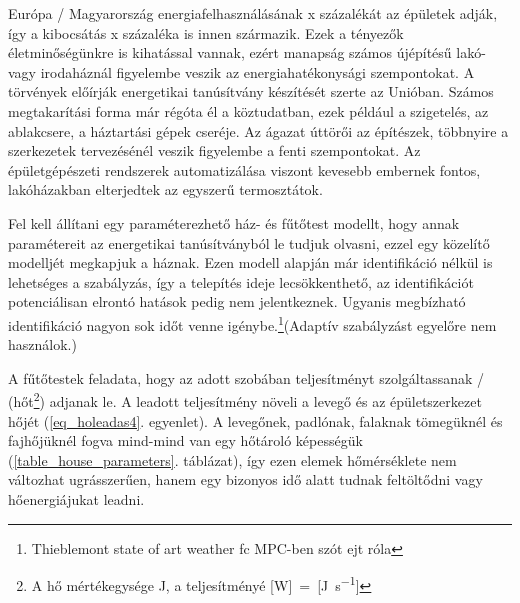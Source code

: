 Európa / Magyarország energiafelhasználásának x százalékát az épületek adják, így a kibocsátás x százaléka is innen származik.
Ezek a tényezők életminőségünkre is kihatással vannak, ezért manapság számos újépítésű lakó- vagy irodaháznál figyelembe veszik az energiahatékonysági szempontokat. A törvények előírják energetikai tanúsítvány készítését szerte az Unióban. Számos megtakarítási forma már régóta él a köztudatban, ezek például a szigetelés, az ablakcsere, a háztartási gépek cseréje. Az ágazat úttörői az építészek, többnyire a szerkezetek tervezésénél veszik figyelembe a fenti szempontokat.
Az épületgépészeti rendszerek automatizálása viszont kevesebb embernek fontos, lakóházakban elterjedtek az egyszerű termosztátok.




Fel kell állítani egy paraméterezhető ház- és fűtőtest modellt, hogy annak paramétereit az energetikai tanúsítványból le tudjuk olvasni, ezzel egy közelítő modelljét megkapjuk a háznak. Ezen modell alapján már identifikáció nélkül is lehetséges a szabályzás, így a telepítés ideje lecsökkenthető, az identifikációt potenciálisan elrontó hatások pedig nem jelentkeznek. Ugyanis megbízható identifikáció nagyon sok időt venne igénybe.\footnote{Thieblemont state of art weather fc MPC-ben szót ejt róla}(Adaptív szabályzást egyelőre nem használok.)





A fűtőtestek feladata, hogy az adott szobában teljesítményt szolgáltassanak / (hőt\footnote{A hő mértékegysége \si{\joule}, a teljesítményé [\si{\watt}]~=~[\si[per-mode=fraction]{\joule\per\second}]}) adjanak le. A leadott teljesítmény növeli a levegő és az épületszerkezet hőjét (\ref{eq_holeadas4}. egyenlet). A levegőnek, padlónak, falaknak tömegüknél és fajhőjüknél fogva mind-mind van egy hőtároló képességük (\ref{table_house_parameters}. táblázat), így ezen elemek hőmérséklete nem változhat ugrásszerűen, hanem egy bizonyos idő alatt tudnak feltöltődni vagy hőenergiájukat leadni. %

